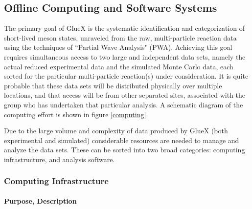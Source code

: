 \documentclass[11pt]{article}
\begin{document}

\subsection{Offline Computing and Software Systems}

The primary goal of GlueX is the systematic identification and
categorization of short-lived meson states, unraveled from the raw,
multi-particle reaction data using the techniques of ``Partial Wave
Analysis" (PWA). Achieving this goal requires simultaneous access to
two large and independent data sets, namely the actual reduced
experimental data and the simulated Monte Carlo data, each sorted for
the particular multi-particle reaction(s) under consideration. It is
quite probable that these data sets will be distributed physically over
multiple locations, and that access will be from other separated
sites, associated with the group who has undertaken that particular
analysis. A schematic diagram of the computing effort is shown in
figure \ref{computing}.



Due to the large volume and complexity of data produced by GlueX
(both experimental and simulated) considerable resources are needed
to manage and analyze the data sets. These can be sorted into two
broad categories: computing infrastructure, and analysis software.





\subsubsection{Computing Infrastructure}


\paragraph{Purpose, Description}
\end{document}
